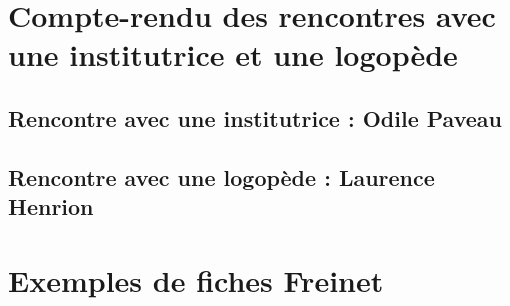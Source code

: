 \appendix
\renewcommand{\thesection}{\Roman{section}}    %
\section{Compte-rendu des rencontres avec une institutrice et une logopède \label{annexeInterview}}
\subsection{Rencontre avec une institutrice : Odile Paveau}
\subsection{Rencontre avec une logopède : Laurence Henrion}

\newpage
\section{Exemples de fiches Freinet}
\label{annexeFreinet}
